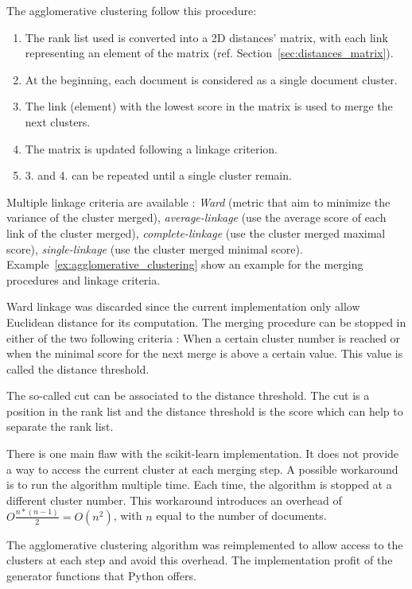 The agglomerative clustering follow this procedure:
\begin{enumerate}
  \item The rank list used is converted into a 2D distances' matrix, with each link representing an element of the matrix (ref. Section~\ref{sec:distances_matrix}).
  \item At the beginning, each document is considered as a single document cluster.
  \item The link (element) with the lowest score in the matrix is used to merge the next clusters.
  \item The matrix is updated following a linkage criterion.
  \item 3. and 4. can be repeated until a single cluster remain.
\end{enumerate}

Multiple linkage criteria are available : \textit{Ward} (metric that aim to minimize the variance of the cluster merged), \textit{average-linkage} (use the average score of each link of the cluster merged), \textit{complete-linkage} (use the cluster merged maximal score), \textit{single-linkage} (use the cluster merged minimal score).
Example~\ref{ex:agglomerative_clustering} show an example for the merging procedures and linkage criteria.

Ward linkage was discarded since the current implementation only allow Euclidean distance for its computation.
The merging procedure can be stopped in either of the two following criteria : When a certain cluster number is reached or when the minimal score for the next merge is above a certain value.
This value is called the distance threshold.

The so-called cut can be associated to the distance threshold.
The cut is a position in the rank list and the distance threshold is the score which can help to separate the rank list.

There is one main flaw with the scikit-learn implementation.
It does not provide a way to access the current cluster at each merging step.
A possible workaround is to run the algorithm multiple time.
Each time, the algorithm is stopped at a different cluster number.
This workaround introduces an overhead of $O\frac{n * (n - 1)}{2} = O(n^2)$, with $n$ equal to the number of documents.

The agglomerative clustering algorithm was reimplemented to allow access to the clusters at each step and avoid this overhead.
The implementation profit of the generator functions that Python offers.

